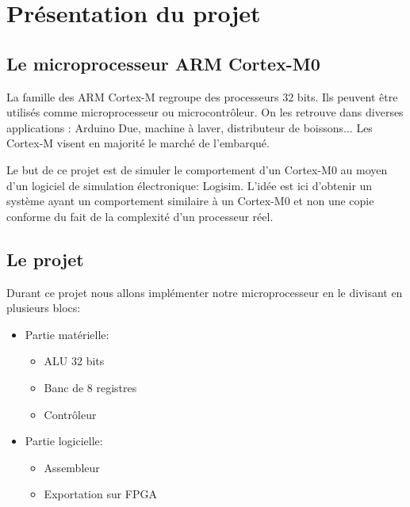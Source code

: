 \section{Présentation du projet}
\subsection{Le microprocesseur ARM Cortex-M0}
	La famille des ARM Cortex-M regroupe des processeurs 32 bits. Ils peuvent être utilisés comme microprocesseur ou microcontrôleur. On les retrouve dans diverses applications : Arduino Due, machine à laver, distributeur de boissons... Les Cortex-M visent en majorité le marché de l'embarqué.

	Le but de ce projet est de simuler le comportement d'un Cortex-M0 au moyen d'un logiciel de simulation électronique: Logisim. L'idée est ici d'obtenir un système ayant un comportement similaire à un Cortex-M0 et non une copie conforme du fait de la complexité d'un processeur réel.

\subsection{Le projet}
	Durant ce projet nous allons implémenter notre microprocesseur en le divisant en plusieurs blocs:
\begin{itemize}
	\item Partie matérielle:
	\begin{itemize}
		\item ALU 32 bits
		\item Banc de 8 registres
		\item Contrôleur
	\end{itemize}
	\item Partie logicielle:
	\begin{itemize}
		\item Assembleur
		\item Exportation sur FPGA
	\end{itemize}
\end{itemize}


